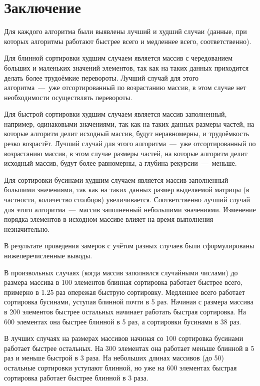 \chapter*{Заключение}
Для каждого алгоритма были выявлены лучший и худший случаи (данные, при которых алгоритмы работают быстрее всего и медленнее всего, соответственно). 

Для блинной сортировки худшим случаем является массив с чередованием больших и маленьких значений элементов, так как на таких данных приходится делать более трудоёмкие перевороты. Лучший случай для этого алгоритма~---~уже отсортированный по возрастанию массив, в этом случае нет необходимости осуществлять перевороты.

Для быстрой сортировки худшим случаем является массив заполненный, например, одинаковыми значениями, так как на таких данных размеры частей, на которые алгоритм делит исходный массив, будут неравномерны, и трудоёмкость резко возрастёт. Лучший случай для этого алгоритма~---~уже отсортированный по возрастанию массив, в этом случае размеры частей, на которые алгоритм делит исходный массив, будут более равномерны, а глубина рекурсии~---~меньше.

Для сортировки бусинами худшим случаем является массив заполненный большими значениями, так как на таких данных размер выделяемой матрицы (в частности, количество столбцов) увеличивается. Соответственно лучший случай для этого алгоритма~---~массив заполненный небольшими значениями. Изменение порядка элементов в исходном массиве влияет на время выполнения незначительно.

В результате проведения замеров с учётом разных случаев были сформулированы нижеперечисленные выводы.

В произвольных случаях (когда массив заполнялся случайными числами) до размера массива в 100 элементов блинная сортировка работает быстрее всего, примерно в 1.25 раз опережая быструю сортировку. Медленнее всего работает сортировка бусинами, уступая блинной почти в 5 раз. Начиная с размера массива в 200 элементов быстрее остальных начинает работать быстрая сортировка. На 600 элементах она быстрее блинной в 5 раз, а сортировки бусинами в 38 раз.

В лучших случаях на размерах массивов начиная со 100 сортировка бусинами работает быстрее остальных. На 300 элементах она работает меньше блинной в 5 раз и меньше быстрой в 3 раза. На небольших длинах массивов (до 50) остальные сортировки уступают блинной, но уже на 600 элементах быстрая сортировка работает быстрее блинной в 3 раза.

